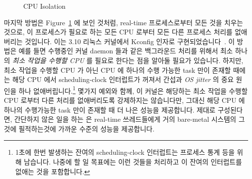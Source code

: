 \begin{figure}[tb]
\centering
{}
\caption{CPU Isolation}
\label{fig:advsync:CPU Isolation}
\end{figure}

마지막 방법은
Figure~\ref{fig:advsync:CPU Isolation} 에 보인 것처럼, real-time 프로세스로부터
모든 것을 치우는 것으로, 이 프로세스가 필요로 하는 모든 CPU 로부터 모든 다른
프로세스 처리를 없애버리는 것입니다.
이는 3.10 리눅스 커널에서  Kconfig 인자로
구현되었습니다~\cite{FredericWeisbecker2013nohz}.
이 방법은 예를 들면 수행중인 커널 daemon 들과 같은 백그라운드 처리를 위해서
최소 하나의 \emph{최소 작업을 수행할 CPU} 를 필요로 한다는 점을 알아둘 필요가
있습니다.
하지만, 최소 작업을 수행할 CPU 가 아닌 CPU 에 하나의 수행 가능한 task 만이
존재할 때에는 해당 CPU 에서 scheduling-clock 인터럽트가 꺼져서 간섭과 \emph{OS
jitter} 의 중요 원인을 하나 없애버립니다.\footnote{
	1초에 한번 발생하는 잔여의 scheduling-clock 인터럽트는 프로세스 통계
	등을 위해 남습니다.
	나중에 할 일 목표에는 이런 것들을 처리하고 이 잔여의 인터럽트를 없애는
	것을 포함합니다.}
몇가지 예외와 함께, 이 커널은 해당하는 최소 작업을 수행할 CPU 로부터 다른
처리를 없애버리도록 강제하지는 않습니다만, 그대신 해당 CPU 에 하나의 수행가능한
task 만이 존재할 때 더 나은 성능을 제공합니다.
제대로 구성된다면, 간단하지 않은 일을 하는  은 real-time
쓰레드들에게 거의 bare-metal 시스템의 그것에 필적하는것에 가까운 수준의 성능을
제공합니다.
\iffalse

